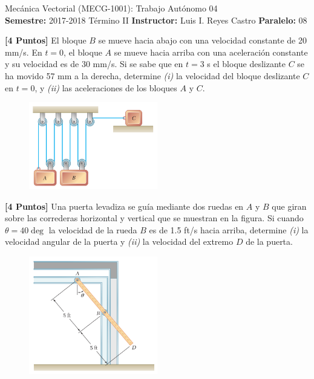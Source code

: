 \documentclass[ a4paper, twoside, 11pt]{article}
\newcommand{\numero}{04}
\begin{document}
\allowdisplaybreaks

\begin{center}
\Large Mec\'anica Vectorial (MECG-1001): Trabajo Aut\'onomo \numero \\[2ex]
\small \textbf{Semestre:} 2017-2018 T\'ermino II \qquad
\textbf{Instructor:} Luis I. Reyes Castro \qquad
\textbf{Paralelo:} 08
\end{center}
\fullskip

\begin{problem}
\textbf{[4 Puntos]} El bloque $B$ se mueve hacia abajo con una velocidad constante de 20 mm/s. En $t=0$, el bloque $A$ se mueve hacia arriba con una aceleraci\'on constante y su velocidad es de 30 mm/s. Si se sabe que en $t=3$ s el bloque deslizante $C$ se ha movido 57 mm a la derecha, determine \textit{(i)} la velocidad del bloque deslizante $C$ en $t=0$, y \textit{(ii)} las aceleraciones de los bloques $A$ y $C$. 

\begin{figure}[htb]
\centering
\includegraphics[width=0.5\textwidth]{problema-1.jpg}
\end{figure}

\end{problem}
\fullskip
\fullskip

\begin{problem}
\textbf{[4 Puntos]} Una puerta levadiza se gu\'ia mediante dos ruedas en $A$ y $B$ que giran sobre las correderas horizontal y vertical que se muestran en la figura. Si cuando $\theta = 40\deg$ la velocidad de la rueda $B$ es de 1.5 ft/s hacia arriba, determine \textit{(i)} la velocidad angular de la puerta y \textit{(ii)} la velocidad del extremo $D$ de la puerta. 

\begin{figure}[htb]
\centering
\includegraphics[width=0.5\textwidth]{problema-2.jpg}
\end{figure}

\end{problem}
\fullskip
\end{document}

